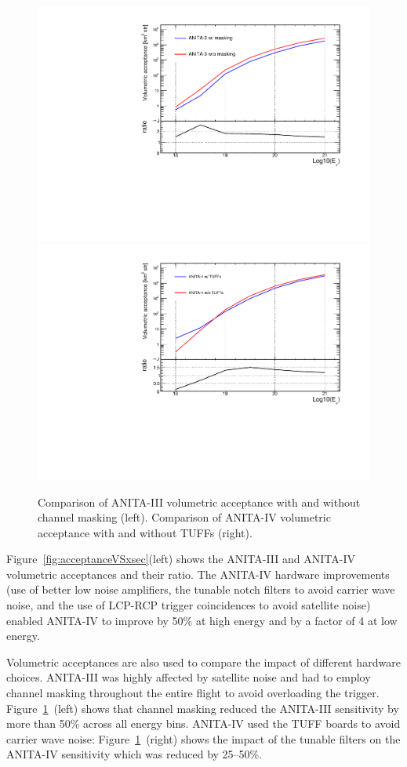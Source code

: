 \begin{figure}[!h]\centering
  \includegraphics[width=.45\linewidth]{./Figs/CompareEffVol_A3masking.pdf}
  \includegraphics[width=.45\linewidth]{./Figs/CompareEffVol_A4tuff.pdf}
  \caption{Comparison of ANITA-III volumetric acceptance with and without channel masking (left).
  Comparison of ANITA-IV volumetric acceptance with and without TUFFs (right).}
  \label{fig:acceptanceVariations}
\end{figure}

Figure~\ref{fig:acceptanceVSxsec}(left) shows the ANITA-III and ANITA-IV volumetric acceptances and their ratio.
The ANITA-IV hardware improvements (use of better low noise amplifiers, the tunable notch filters to avoid carrier wave noise, and the use of LCP-RCP trigger coincidences to avoid satellite noise) enabled ANITA-IV to improve by 50\% at high energy and by a factor of 4 at low energy.

Volumetric acceptances are also used to compare the impact of different hardware choices.
ANITA-III was highly affected by satellite noise and had to employ channel masking throughout the entire flight to avoid overloading the trigger. Figure~\ref{fig:acceptanceVariations}~(left) shows that channel masking reduced the ANITA-III sensitivity by more than 50\% across all energy bins.
ANITA-IV used the TUFF boards to avoid carrier wave noise: Figure~\ref{fig:acceptanceVariations}~(right) shows the impact of the tunable filters on the ANITA-IV sensitivity which was reduced by 25--50\%.


